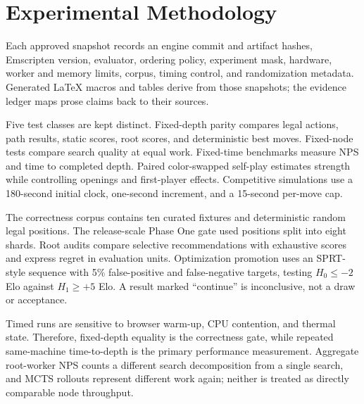 \section{Experimental Methodology}
Each approved snapshot records an engine commit and artifact hashes, Emscripten version, evaluator, ordering policy, experiment mask, hardware, worker and memory limits, corpus, timing control, and randomization metadata. Generated LaTeX macros and tables derive from those snapshots; the evidence ledger maps prose claims back to their sources.

Five test classes are kept distinct. Fixed-depth parity compares legal actions, path results, static scores, root scores, and deterministic best moves. Fixed-node tests compare search quality at equal work. Fixed-time benchmarks measure NPS and time to completed depth. Paired color-swapped self-play estimates strength while controlling openings and first-player effects. Competitive simulations use a 180-second initial clock, one-second increment, and a 15-second per-move cap.

The correctness corpus contains ten curated fixtures and deterministic random legal positions. The release-scale Phase One gate used \ParityPositions positions split into eight shards. Root audits compare selective recommendations with exhaustive scores and express regret in evaluation units. Optimization promotion uses an SPRT-style sequence with 5\% false-positive and false-negative targets, testing $H_0\leq-2$ Elo against $H_1\geq+5$ Elo. A result marked ``continue'' is inconclusive, not a draw or acceptance.

Timed runs are sensitive to browser warm-up, CPU contention, and thermal state. Therefore, fixed-depth equality is the correctness gate, while repeated same-machine time-to-depth is the primary performance measurement. Aggregate root-worker NPS counts a different search decomposition from a single search, and MCTS rollouts represent different work again; neither is treated as directly comparable node throughput.
